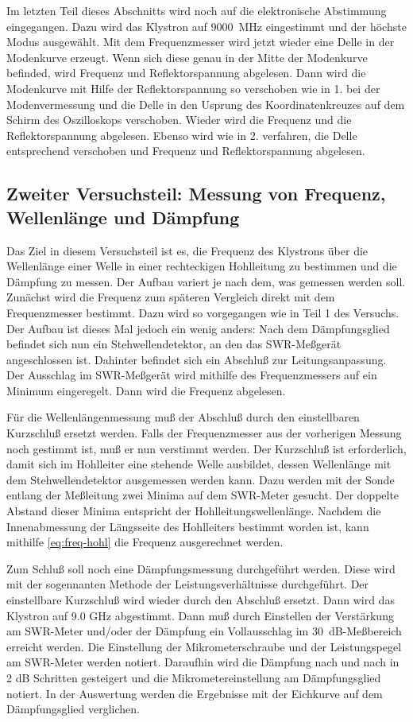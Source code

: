 Im letzten Teil dieses Abschnitts wird noch auf die elektronische
Abstimmung eingegangen.  Dazu wird das Klystron auf \SI{9000}{MHz}
eingestimmt und der höchste Modus ausgewählt.  Mit dem Frequenzmesser
wird jetzt wieder eine Delle in der Modenkurve erzeugt.  Wenn sich diese
genau in der Mitte der Modenkurve befinded, wird Frequenz und
Reflektorspannung abgelesen.  Dann wird die Modenkurve mit Hilfe der
Reflektorspannung so verschoben wie in 1. bei der Modenvermessung und
die Delle in den Usprung des Koordinatenkreuzes auf dem Schirm des
Oszilloskops verschoben.  Wieder wird die Frequenz und die
Reflektorspannung abgelesen.  Ebenso wird wie in 2. verfahren, die Delle
entsprechend verschoben und Frequenz und Reflektorspannung abgelesen.

\subsection{%
  Zweiter Versuchsteil: Messung von Frequenz, Wellenlänge und Dämpfung}

Das Ziel in diesem Versuchsteil ist es, die Frequenz des Klystrons über
die Wellenlänge einer Welle in einer rechteckigen Hohlleitung zu
bestimmen und die Dämpfung zu messen.  Der Aufbau variert je nach dem,
was gemessen werden soll. Zunächst wird die Frequenz zum späteren
Vergleich direkt mit dem Frequenzmesser bestimmt.  Dazu wird so
vorgegangen wie in Teil 1 des Versuchs.  Der Aufbau ist dieses Mal
jedoch ein wenig anders: Nach dem Dämpfungsglied befindet sich nun ein
Stehwellendetektor, an den das SWR-Meßgerät angeschlossen ist.  Dahinter
befindet sich ein Abschluß zur Leitungsanpassung.  Der Ausschlag im
SWR-Meßgerät wird mithilfe des Frequenzmessers auf ein Minimum
eingeregelt.  Dann wird die Frequenz abgelesen.

Für die Wellenlängenmessung muß der Abschluß durch den einstellbaren
Kurzschluß ersetzt werden.  Falls der Frequenzmesser aus der vorherigen
Messung noch gestimmt ist, muß er nun verstimmt werden.  Der Kurzschluß
ist erforderlich, damit sich im Hohlleiter eine stehende Welle
ausbildet, dessen Wellenlänge mit dem Stehwellendetektor ausgemessen
werden kann.  Dazu werden mit der Sonde entlang der Meßleitung zwei Minima
auf dem SWR-Meter gesucht.  Der doppelte Abstand dieser Minima
entspricht der Hohlleitungswellenlänge.  Nachdem die Innenabmessung der
Längsseite des Hohlleiters bestimmt worden ist, kann mithilfe
\cref{eq:freq-hohl} die Frequenz ausgerechnet werden.

Zum Schluß soll noch eine Dämpfungsmessung durchgeführt werden.  Diese
wird mit der sogennanten Methode der Leistungsverhältnisse
durchgeführt. Der einstellbare Kurzschluß wird wieder durch den Abschluß
ersetzt.  Dann wird das Klystron auf 9.0 GHz abgestimmt.  Dann muß durch
Einstellen der Verstärkung am SWR-Meter und/oder der Dämpfung ein
Vollausschlag im \SI{30}{dB}-Meßbereich erreicht werden.  Die
Einstellung der Mikrometerschraube und der Leistungspegel am SWR-Meter
werden notiert.  Daraufhin wird die Dämpfung nach und nach in 2 dB
Schritten gesteigert und die Mikrometereinstellung am Dämpfungsglied
notiert.  In der Auswertung werden die Ergebnisse mit der Eichkurve auf
dem Dämpfungsglied verglichen.

